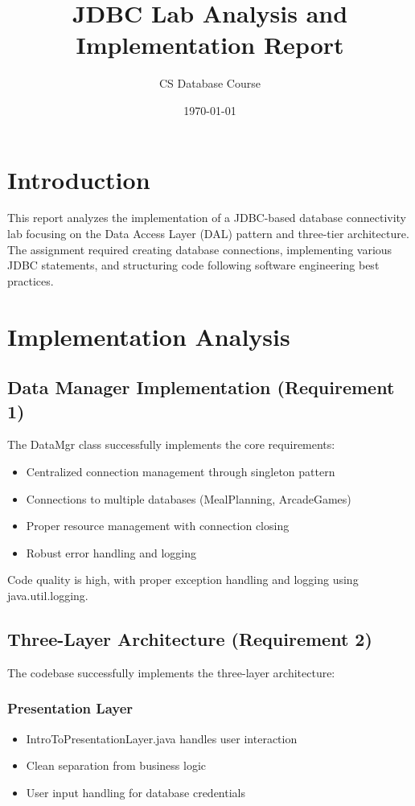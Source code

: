 \documentclass{article}
\title{JDBC Lab Analysis and Implementation Report}
\author{CS Database Course}
\date{\today}
\begin{document}
\maketitle

\section{Introduction}
This report analyzes the implementation of a JDBC-based database connectivity lab focusing on the Data Access Layer (DAL) pattern and three-tier architecture. The assignment required creating database connections, implementing various JDBC statements, and structuring code following software engineering best practices.

\section{Implementation Analysis}

\subsection{Data Manager Implementation (Requirement 1)}
The DataMgr class successfully implements the core requirements:
\begin{itemize}
    \item Centralized connection management through singleton pattern
    \item Connections to multiple databases (MealPlanning, ArcadeGames)
    \item Proper resource management with connection closing
    \item Robust error handling and logging
\end{itemize}

Code quality is high, with proper exception handling and logging using java.util.logging.

\subsection{Three-Layer Architecture (Requirement 2)}
The codebase successfully implements the three-layer architecture:

\subsubsection{Presentation Layer}
\begin{itemize}
    \item IntroToPresentationLayer.java handles user interaction
    \item Clean separation from business logic
    \item User input handling for database credentials
\end{itemize}
\end{document}
